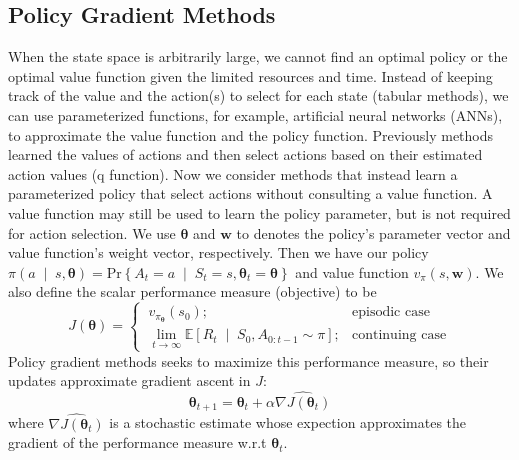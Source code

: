 \documentclass[balance,upint,subscriptcorrection,varvw,mathalfa=cal=boondoxo,pdf-a,nofoot]{asmeconf}
\begin{document}
\subsection{Policy Gradient Methods~\cite{Sutton1998}}
\noindent When the state space is arbitrarily large, we cannot find an optimal 
policy or the optimal value function given the limited resources and time. 
Instead of keeping track of the value and the action(s) to select for each 
state (tabular methods), we can use parameterized functions, for example, 
artificial neural networks (ANNs), to approximate the value function and the 
policy function.
\vspace{3mm}\newline Previously methods learned the values of actions and then
select actions based on their estimated action values (q function). Now we
consider methods that instead learn a parameterized policy that select actions
without consulting a value function. A value function may still be used to
learn the policy parameter, but is not required for action selection.
\vspace{3mm}\newline We use \(\bm{\theta}\) and \(\bm{w}\) to denotes the
policy's parameter vector and value function's weight vector, respectively.
Then we have our policy \(\pi\left(a\;\middle|\;s, \bm{\theta}\right)
=\text{Pr}\left\{A_t=a\;\middle|\;S_t=s, \bm{\theta}_t=\bm{\theta}\right\}\) and
value function \(v_\pi(s, \bm{w})\). We also define the scalar performance
measure (objective) to be
\[J(\bm{\theta})=\begin{cases}
    \ v_{\pi_{\bm{\theta}}}(s_0); &\text{episodic case}\\
    \ \lim_{t \to \infty} \mathbb{E}
    \left[R_t\;\middle|\;S_0,A_{0:t-1}\sim\pi\right];
                                  & \text{continuing case}
\end{cases}\]
Policy gradient methods seeks to maximize this performance measure, so their
updates approximate gradient ascent in \(J\):
\[\bm{\theta}_{t+1}=\bm{\theta}_t+\alpha\widehat{\nabla J(\bm{\theta}_t)}\]
where \(\widehat{\nabla J(\bm{\theta}_t)}\) is a stochastic estimate whose
expection approximates the gradient of the performance measure w.r.t
\(\bm{\theta}_t\).
\end{document}
